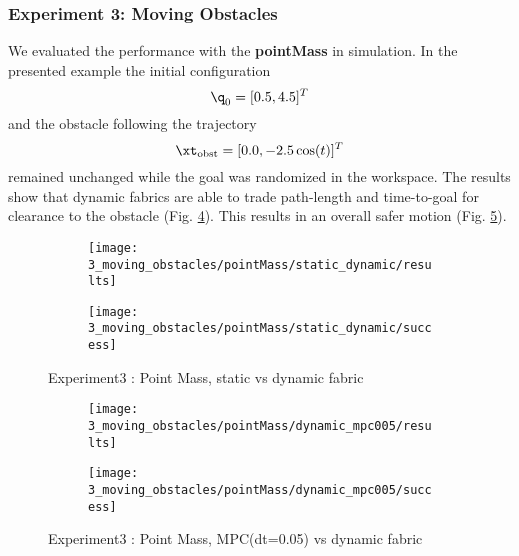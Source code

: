 \subsubsection{Experiment 3: Moving Obstacles}%
\label{app:sub:experiment_3_moving_obstacles}

We evaluated the performance with the \textbf{pointMass} in simulation. In the presented
example the initial configuration \[\q_0 = [0.5, 4.5]^T\] and the obstacle following the
trajectory \[\xt_{\textrm{obst}} = [0.0, -2.5\cos(t)]^T\] remained unchanged while the
goal was randomized in the workspace. The results show that dynamic fabrics are able to
trade path-length and time-to-goal for clearance to the obstacle (Fig.
\ref{subfig:experiment3_pointMass_static_dynamic_res}). This results in an
overall safer motion (Fig. \ref{subfig:experiment3_pointMass_static_dynamic_success}).

\begin{figure}[ht]
  \centering
  \begin{subfigure}{0.7\linewidth}
    \centering
    \texttt{[image: 3\_moving\_obstacles/pointMass/static\_dynamic/results]}
    \caption{}
    \label{subfig:experiment3_pointMass_static_dynamic_res}
  \end{subfigure}%
  \begin{subfigure}{0.3\linewidth}
    \centering
    \texttt{[image: 3\_moving\_obstacles/pointMass/static\_dynamic/success]}
    \caption{}
    \label{subfig:experiment3_pointMass_static_dynamic_success}
  \end{subfigure}
  \caption{Experiment3 : Point Mass, static vs dynamic fabric}%
  \label{fig:experiment3_pointMass}
\end{figure}

\begin{figure}[ht]
  \centering
  \begin{subfigure}{0.7\linewidth}
    \centering
    \texttt{[image: 3\_moving\_obstacles/pointMass/dynamic\_mpc005/results]}
    \caption{}
    \label{subfig:experiment3_pointMass_static_dynamic_res}
  \end{subfigure}%
  \begin{subfigure}{0.3\linewidth}
    \centering
    \texttt{[image: 3\_moving\_obstacles/pointMass/dynamic\_mpc005/success]}
    \caption{}
    \label{subfig:experiment3_pointMass_static_dynamic_success}
  \end{subfigure}
  \caption{Experiment3 : Point Mass, MPC(dt=0.05) vs dynamic fabric}%
  \label{fig:experiment3_pointMass}
\end{figure}

